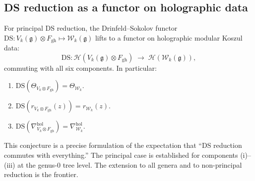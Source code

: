 \subsection{DS reduction as a functor on holographic data}

\begin{conjecture}
For principal DS reduction, the Drinfeld--Sokolov functor
$\mathrm{DS}: V_k(\mathfrak{g})\otimes F_{\mathrm{gh}}
\mapsto \mathcal{W}_k(\mathfrak{g})$
lifts to a functor on holographic modular Koszul data:
\begin{equation}%
\mathrm{DS}: \mathcal{H}(V_k(\mathfrak{g})\otimes F_{\mathrm{gh}})
\;\longrightarrow\;
\mathcal{H}(\mathcal{W}_k(\mathfrak{g})),
\end{equation}
commuting with all six components. In particular:
\begin{enumerate}[label=\textup{(\roman*)}]
\item $\mathrm{DS}(\Theta_{V_k\otimes F_{\mathrm{gh}}}) = \Theta_{\mathcal{W}_k}$.
\item $\mathrm{DS}(r_{V_k\otimes F_{\mathrm{gh}}}(z)) = r_{\mathcal{W}_k}(z)$.
\item $\mathrm{DS}(\nabla^{\mathrm{hol}}_{V_k\otimes F_{\mathrm{gh}}})
 = \nabla^{\mathrm{hol}}_{\mathcal{W}_k}$.
\end{enumerate}
\end{conjecture}

\begin{remark}
This conjecture is a precise formulation of the expectation that
``DS reduction commutes with everything.'' The principal case is
established for components (i)--(iii) at the genus-$0$ tree level.
The extension to all genera and to non-principal reduction is the
frontier.
\end{remark}

